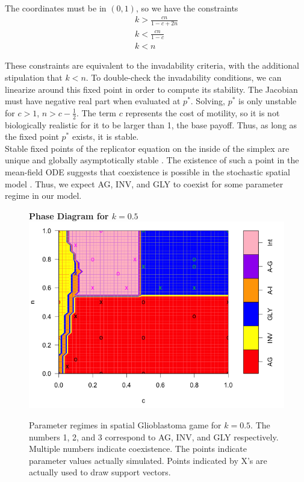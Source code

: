 \documentclass[12pt]{report}
\begin{document}
		
The coordinates must be in $(0,1)$, so we have the constraints
\begin{gather}
k > \frac{cn}{1 - c + 2n}\\
k < \frac{cn}{1-c} \\
k < n
\end{gather}

These constraints are equivalent to the invadability criteria, with the additional stipulation that $k < n$. 
To double-check the invadability conditions, we can linearize around this fixed point in order to compute its stability. The Jacobian must have negative real part when evaluated at $p^*$. Solving, $p^*$ is only unstable for $c > 1$, $n > c - \frac{1}{2}$. The term $c$ represents the cost of motility, so it is not biologically realistic for it to be larger than 1, the base payoff. Thus, as long as the fixed point $p^*$ exists, it is stable. \\

Stable fixed points of the replicator equation on the inside of the simplex are unique and globally asymptotically stable \cite{Hofbauer1998}. The existence of such a point in the mean-field ODE suggests that coexistence is possible in the stochastic spatial model \cite{Durrett1994}. Thus, we expect AG, INV, and GLY to coexist for some parameter regime in our model. 


\begin{figure}[H]
\centering
\textbf{Phase Diagram for $k = 0.5$}
\includegraphics[width = 0.9 \linewidth]{Diagrams/basanta_phase}
\caption{Parameter regimes in spatial Glioblastoma game for $k = 0.5$. The numbers 1, 2, and 3 correspond to AG, INV, and GLY respectively. Multiple numbers indicate coexistence. The points indicate parameter values actually simulated. Points indicated by X's are actually used to draw support vectors.}
\end{figure}
\end{document}
